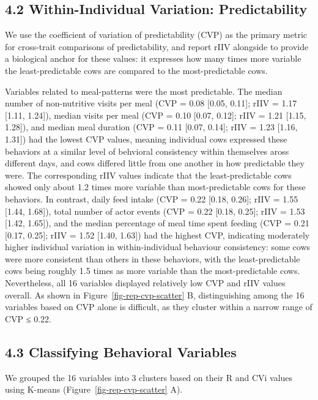 \documentclass[
]{article}
\begin{document}
\subsection{4.2 Within-Individual Variation:
Predictability}\label{within-individual-variation-predictability}

We use the coefficient of variation of predictability (CVP) as the
primary metric for cross-trait comparisons of predictability, and report
rIIV alongside to provide a biological anchor for these values: it
expresses how many times more variable the least-predictable cows are
compared to the most-predictable cows.

Variables related to meal-patterns were the most predictable. The median
number of non-nutritive visits per meal (CVP = 0.08 {[}0.05, 0.11{]};
rIIV = 1.17 {[}1.11, 1.24{]}), median visits per meal (CVP = 0.10
{[}0.07, 0.12{]}; rIIV = 1.21 {[}1.15, 1.28{]}), and median meal
duration (CVP = 0.11 {[}0.07, 0.14{]}; rIIV = 1.23 {[}1.16, 1.31{]}) had
the lowest CVP values, meaning individual cows expressed these behaviors
at a similar level of behvioral consistency within themselves aross
different days, and cows differed little from one another in how
predictable they were. The corresponding rIIV values indicate that the
least-predictable cows showed only about 1.2 times more variable than
most-predictable cows for these behaviors. In contrast, daily feed
intake (CVP = 0.22 {[}0.18, 0.26{]}; rIIV = 1.55 {[}1.44, 1.68{]}),
total number of actor events (CVP = 0.22 {[}0.18, 0.25{]}; rIIV = 1.53
{[}1.42, 1.65{]}), and the median percentage of meal time spent feeding
(CVP = 0.21 {[}0.17, 0.25{]}; rIIV = 1.52 {[}1.40, 1.63{]}) had the
highest CVP, indicating moderately higher individual variation in
within-individual behaviour consistency: some cows were more consistent
than others in these behaviors, with the least-predictable cows being
roughly 1.5 times as more variable than the most-predictable cows.
Nevertheless, all 16 variables displayed relatively low CVP and rIIV
values overall. As shown in Figure~\ref{fig-rep-cvp-scatter} B,
distinguishing among the 16 variables based on CVP alone is difficult,
as they cluster within a narrow range of CVP ≤ 0.22.

\subsection{4.3 Classifying Behavioral
Variables}\label{classifying-behavioral-variables}

We grouped the 16 variables into 3 clusters based on their R and CVi
values using K-means (Figure~\ref{fig-rep-cvp-scatter} A).
\end{document}
